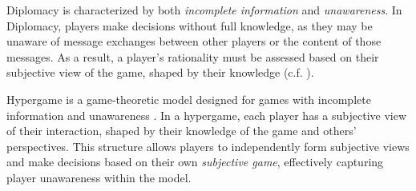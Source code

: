 Diplomacy is characterized by both \emph{incomplete information} and \emph{unawareness}. 
In Diplomacy, players make decisions without full knowledge, as they may be unaware of message exchanges between other players or the content of those messages. 
As a result, a player's rationality must be assessed based on their subjective view of the game, shaped by their knowledge (c.f. \citep{kulkarni2021synthesis,kulkarni2020deceptive}).



Hypergame is a game-theoretic model designed for games with incomplete information and unawareness  \citep{bennett1980hypergames,sasaki2012hypergames}.
In a hypergame, each player has a subjective view of their interaction, shaped by their knowledge of the game and others' perspectives.
This structure allows players to independently form subjective views and make decisions based on their own \emph{subjective game}, effectively capturing player unawareness within the model.



